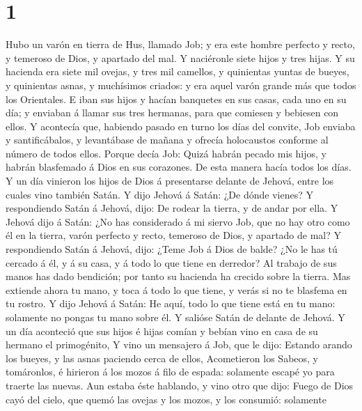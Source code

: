 \hypertarget{section}{%
\section{1}\label{section}}

 Hubo un varón en tierra de Hus, llamado Job; y era este
hombre perfecto y recto, y temeroso de Dios, y apartado del mal.
 Y naciéronle siete hijos y tres hijas.  Y
su hacienda era siete mil ovejas, y tres mil camellos, y quinientas
yuntas de bueyes, y quinientas asnas, y muchísimos criados: y era aquel
varón grande más que todos los Orientales.  E iban sus
hijos y hacían banquetes en sus casas, cada uno en su día; y enviaban á
llamar sus tres hermanas, para que comiesen y bebiesen con ellos.
 Y acontecía que, habiendo pasado en turno los días del
convite, Job enviaba y santificábalos, y levantábase de mañana y ofrecía
holocaustos conforme al número de todos ellos. Porque decía Job: Quizá
habrán pecado mis hijos, y habrán blasfemado á Dios en sus corazones. De
esta manera hacía todos los días.  Y un día vinieron los
hijos de Dios á presentarse delante de Jehová, entre los cuales vino
también Satán.  Y dijo Jehová á Satán: ¿De dónde vienes? Y
respondiendo Satán á Jehová, dijo: De rodear la tierra, y de andar por
ella.  Y Jehová dijo á Satán: ¿No has considerado á mi
siervo Job, que no hay otro como él en la tierra, varón perfecto y
recto, temeroso de Dios, y apartado de mal?  Y
respondiendo Satán á Jehová, dijo: ¿Teme Job á Dios de balde?
 ¿No le has tú cercado á él, y á su casa, y á todo lo que
tiene en derredor? Al trabajo de sus manos has dado bendición; por tanto
su hacienda ha crecido sobre la tierra.  Mas extiende
ahora tu mano, y toca á todo lo que tiene, y verás si no te blasfema en
tu rostro.  Y dijo Jehová á Satán: He aquí, todo lo que
tiene está en tu mano: solamente no pongas tu mano sobre él. Y salióse
Satán de delante de Jehová.  Y un día aconteció que sus
hijos é hijas comían y bebían vino en casa de su hermano el primogénito,
 Y vino un mensajero á Job, que le dijo: Estando arando
los bueyes, y las asnas paciendo cerca de ellos, 
Acometieron los Sabeos, y tomáronlos, é hirieron á los mozos á filo de
espada: solamente escapé yo para traerte las nuevas.  Aun
estaba éste hablando, y vino otro que dijo: Fuego de Dios cayó del
cielo, que quemó las ovejas y los mozos, y los consumió: solamente
